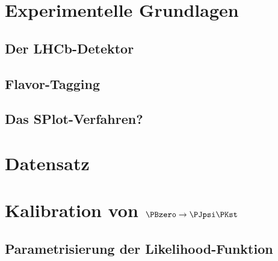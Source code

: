 \section{Experimentelle Grundlagen}

\subsection{Der LHCb-Detektor}

\subsection{Flavor-Tagging}


\subsection{Das SPlot-Verfahren?}

\section{Datensatz}

\section{\texorpdfstring{Kalibration von $\PBzero \to \PJpsi \PKst$}{Kalibration von B0 -> JpsiKst}}


\subsection{Parametrisierung der Likelihood-Funktion}

